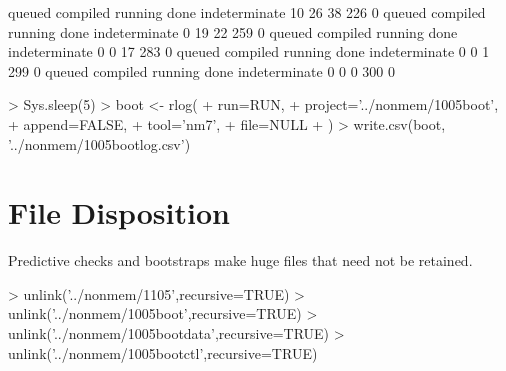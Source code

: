 \begin{Schunk}
\begin{Soutput}
       queued      compiled       running          done indeterminate 
           10            26            38           226             0 
       queued      compiled       running          done indeterminate 
            0            19            22           259             0 
       queued      compiled       running          done indeterminate 
            0             0            17           283             0 
       queued      compiled       running          done indeterminate 
            0             0             1           299             0 
       queued      compiled       running          done indeterminate 
            0             0             0           300             0 
\end{Soutput}
\begin{Sinput}
> Sys.sleep(5)
> boot <- rlog(
+ 	run=RUN,
+ 	project='../nonmem/1005boot',
+ 	append=FALSE,
+ 	tool='nm7',
+   file=NULL
+ )
> write.csv(boot, '../nonmem/1005bootlog.csv')
\end{Sinput}
\end{Schunk}
\section{File Disposition}
Predictive checks and bootstraps make huge files that need not be retained.
\begin{Schunk}
\begin{Sinput}
> unlink('../nonmem/1105',recursive=TRUE)
> unlink('../nonmem/1005boot',recursive=TRUE)
> unlink('../nonmem/1005bootdata',recursive=TRUE)
> unlink('../nonmem/1005bootctl',recursive=TRUE)
\end{Sinput}
\end{Schunk}

